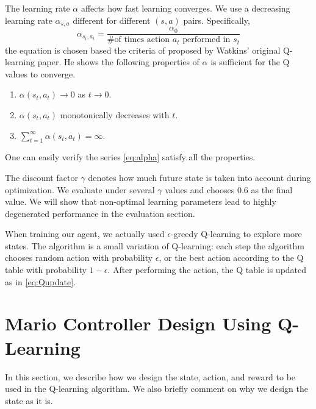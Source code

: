 The learning rate $\alpha$ affects how fast learning converges. We use a decreasing learning rate $\alpha_{s, a}$ \cite{watkins} different for different $(s,a)$ pairs. Specifically, 
\begin{equation}
\label{eq:alpha}
\alpha_{s_t, a_t} = \frac{\alpha_0}{\text{\# of times action $a_t$ performed in $s_t$}}
\end{equation}
the equation is chosen based the criteria of proposed by Watkins' original Q-learning paper. He shows the following properties of $\alpha$ is sufficient for the Q values to converge.
\begin{enumerate}
\item
$\alpha(s_t, a_t) \rightarrow 0$ as $t\rightarrow 0$.
\item
$\alpha(s_t, a_t)$ monotonically decreases with $t$.
\item
$\sum_{t=1}^{\infty}\alpha(s_t, a_t) = \infty$.
\end{enumerate}
One can easily verify the series \ref{eq:alpha} satisfy all the properties.

The discount factor $\gamma$ denotes how much future state is taken into account during optimization. We evaluate under several $\gamma$ values and chooses 0.6 as the final value. We will show that non-optimal learning parameters lead to highly degenerated performance in the evaluation section.

When training our agent, we actually used $\epsilon$-greedy Q-learning to explore more states. The algorithm is a small variation of Q-learning: each step the algorithm chooses random action with probability $\epsilon$, or the best action according to the Q table with probability $1 - \epsilon$. After performing the action, the Q table is updated as in \ref{eq:Qupdate}.

\section{Mario Controller Design Using Q-Learning}
In this section, we describe how we design the state, action, and reward to be used in the Q-learning algorithm. We also briefly comment on why we design the state as it is.
